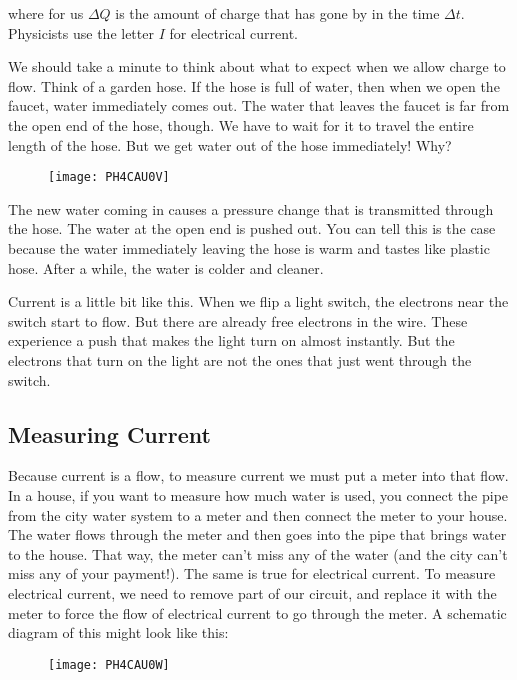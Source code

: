 where for us $\Delta Q$ is the amount of charge that has gone by in the time $\Delta t.$ Physicists use the letter $I$ for electrical current.

We should take a minute to think about what to expect when we allow charge to flow. Think of a garden hose. If the hose is full of water, then when we open the faucet, water immediately comes out. The water that leaves the faucet is far from the open end of the hose, though. We have to wait for it to travel the entire length of the hose. But we get water out of the hose immediately! Why? 

\begin{figure}[h!]
	\centering
    \texttt{[image: PH4CAU0V]}
\end{figure}

The new water coming in causes a pressure change that is transmitted through the hose. The water at the open end is pushed out. You can tell this is the case because the water immediately leaving the hose is warm and tastes like plastic hose. After a while, the water is colder and cleaner.

Current is a little bit like this. When we flip a light switch, the electrons near the switch start to flow. But there are already free electrons in the wire. These experience a push that makes the light turn on almost instantly. But the electrons that turn on the light are not the ones
that just went through the switch. 

\subsection{Measuring Current}

Because current is a flow, to measure current we must put a meter into that flow. In a house, if you want to measure how much water is used, you connect the pipe from the city water system to a meter and then connect the meter to your house. The water flows through the meter and then goes into the pipe that brings water to the house. That way, the meter can't miss any of the water (and the city can't miss any of your payment!). The same is true for electrical current. To measure electrical current, we need to remove part of our circuit, and replace it with the meter to force the flow of electrical current to go through the meter. A schematic diagram of this might look like this: 

\begin{figure}[h!]
	\centering
    \texttt{[image: PH4CAU0W]}
\end{figure}

